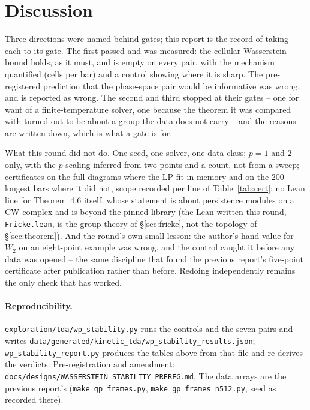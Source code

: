\documentclass[11pt,a4paper]{article}
\newcommand{\lean}[1]{\texttt{\small #1}}
\begin{document}
\section{Discussion}

Three directions were named behind gates; this report is the record of taking each to its gate.
The first passed and was measured: the cellular Wasserstein bound holds, as it must, and is empty on
every pair, with the mechanism quantified (cells per bar) and a control showing where it is sharp.
The pre-registered prediction that the phase-space pair would be informative was wrong, and is
reported as wrong. The second and third stopped at their gates -- one for want of a finite-temperature
solver, one because the theorem it was compared with turned out to be about a group the data does not
carry -- and the reasons are written down, which is what a gate is for.

What this round did not do. One seed, one solver, one data class; $p=1$ and $2$ only, with the
$p$-scaling inferred from two points and a count, not from a sweep; certificates on the full diagrams
where the LP fit in memory and on the 200 longest bars where it did not, scope recorded per line of
Table~\ref{tab:cert}; no Lean line for Theorem~4.6 itself, whose statement is about persistence
modules on a CW complex and is beyond the pinned library (the Lean written this round,
\lean{Fricke.lean}, is the group theory of \S\ref{sec:fricke}, not the topology of \S\ref{sec:theorem}). And the round's own small lesson: the
author's hand value for $W_2$ on an eight-point example was wrong, and the control caught it before
any data was opened -- the same discipline that found the previous report's five-point certificate
after publication rather than before. Redoing independently remains the only check that has worked.

\paragraph{Reproducibility.} \lean{exploration/tda/wp\_stability.py} runs the controls and the seven
pairs and writes \lean{data/generated/kinetic\_tda/wp\_stability\_results.json};
\lean{wp\_stability\_report.py} produces the tables above from that file and re-derives the verdicts.
Pre-registration and amendment: \lean{docs/designs/WASSERSTEIN\_STABILITY\_PREREG.md}. The data arrays
are the previous report's (\lean{make\_gp\_frames.py}, \lean{make\_gp\_frames\_n512.py}, seed as
recorded there).



\end{document}
